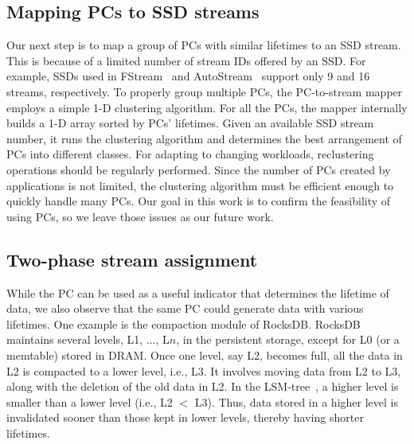 \subsection{Mapping PCs to SSD streams}
\vspace{-5pt}
Our next step is to map a group of PCs with similar lifetimes to an SSD stream.
This is because of a limited number of stream IDs offered by an SSD. For
example, SSDs used in FStream~\cite{FStream} and AutoStream~\cite{AutoStream}
support only 9 and 16 streams, respectively. To properly group multiple PCs,
the PC-to-stream mapper employs a simple 1-D clustering algorithm.  For all the
PCs, the mapper internally builds a 1-D array sorted by PCs' lifetimes.  Given
an available SSD stream number, it runs the clustering algorithm and determines
the best arrangement of PCs into different classes.  For adapting to changing
workloads, reclustering operations should be regularly performed. Since the
number of PCs created by applications is not limited, the clustering algorithm
must be efficient enough to quickly handle many PCs. Our goal in this work is
to confirm the feasibility of using PCs, so we leave
those issues as our future work.

\vspace{-5pt}
\subsection{Two-phase stream assignment}
\vspace{-5pt}


While the PC can be used as a useful indicator that determines the lifetime of
data, we also observe that the same PC could generate data with various
lifetimes. One example is the compaction module of RocksDB. RocksDB maintains
several levels, L1, ..., L$n$, in the persistent storage, except for L0 (or a
memtable) stored in DRAM.  Once one level, say L2, becomes full, all the data
in L2 is compacted to a lower level, i.e., L3.  It involves moving data from L2
to L3, along with the deletion of the old data in L2.  In the
LSM-tree~\cite{LSM}, a higher level is smaller than a lower level (i.e., L2 $<$
L3). Thus, data stored in a higher level is invalidated sooner than those kept
in lower levels, thereby having shorter lifetimes.


